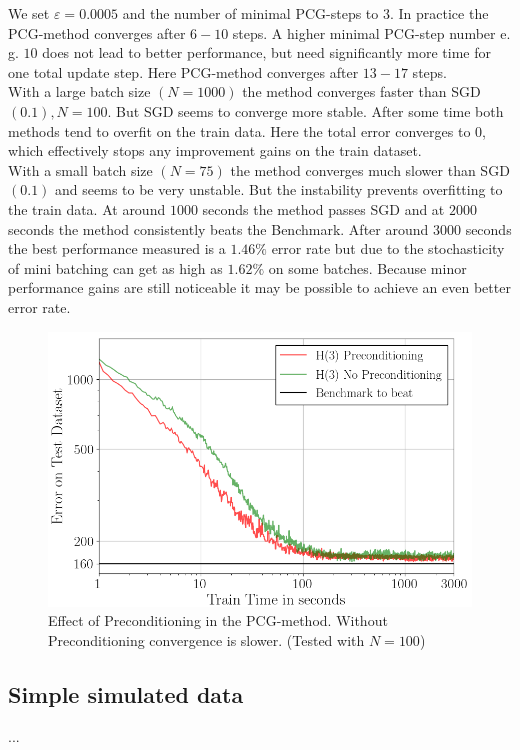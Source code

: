 \documentclass[conference]{IEEEtran}
\begin{document}
We set $\varepsilon=0.0005$ and the number of minimal PCG-steps to $3$. In practice the PCG-method converges after $6-10$ steps. A higher minimal PCG-step number e. g. $10$ does not lead to better performance, but need significantly more time for one total update step. Here PCG-method converges after $13-17$ steps.\\
With a large batch size $(N=1000)$ the method converges faster than SGD$(0.1), N=100.$ But SGD seems to converge more stable. After some time both methods tend to overfit on the train data. Here the total error converges to $0$, which effectively stops any improvement gains on the train dataset.\\
With a small batch size $(N=75)$ the method converges much slower than SGD$(0.1)$ and seems to be very unstable. But the instability prevents overfitting to the train data. At around $1000$ seconds the method passes SGD and at $2000$ seconds the method consistently beats the Benchmark. After around $3000$ seconds the best performance measured is a $1.46\%$ error rate but due to the stochasticity of mini batching can get as high as $1.62\%$ on some batches. Because minor performance gains are still noticeable it may be possible to achieve an even better error rate. \\

\begin{figure}[htbp]
	\centerline{\includegraphics[scale=0.53]{Precond.png}}
	\caption{Effect of Preconditioning in the PCG-method. Without Preconditioning convergence is slower. (Tested with $N=100$)}
	\label{fig}
\end{figure}	


\subsection{Simple simulated data}
...
\end{document}
